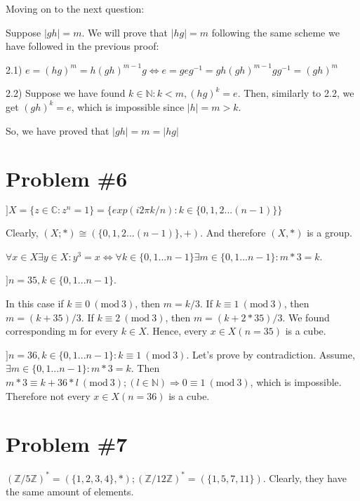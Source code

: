 \documentclass[a4paper,12pt]{article}
\newcommand{\Mod}[1]{\ (\mathrm{mod}\ #1)}
\newcommand{\gmznz}[1]{(\mathbb{Z}/#1\mathbb{Z})^*}
\begin{document}
Moving on to the next question:

Suppose $ |gh| = m $. We will prove that $ |hg| = m $ following the same scheme we have followed in the previous proof:

2.1) $ e = (hg)^{m} = h(gh)^{m-1}g \Leftrightarrow e = geg^{-1} = gh(gh)^{m-1}gg^{-1}= (gh)^m$

2.2)  Suppose we have found $ k\in \mathbb{N}: k < m , (hg)^{k} = e$. Then, similarly to 2.2, we get $ (gh)^k = e $, which is impossible since $ |h| = m > k $.

So, we have proved that $ |gh| = m = |hg|$
\hfill \square

\section*{Problem \#6}

\triangle

$\big] X = \{ z \in \mathbb{C} : z^n = 1 \} = \{ exp(i2\pi k / n): k \in \{0,1,2...(n-1)\} \}$

Clearly, $ (X; *) \cong (\{0,1,2...(n-1)\}, +) $. And therefore $ (X, *) $ is a group.

%		

$ \forall x \in X \exists y \in X : y^3 = x \Leftrightarrow \forall k \in \{0,1...n-1\} \exists m \in \{0,1...n-1\} : m*3 = k $.

$ \big] n = 35, k\in \{0,1...n-1\}$.

In this case if $ k\equiv 0 \Mod{3} $, then $ m = k/3 $. If $ k\equiv 1 \Mod{3} $, then $ m = (k+35)/3 $. If $ k\equiv2 \Mod{3} $, then $ m = (k+2*35)/3 $. We found corresponding m for every $ k\in X $. Hence, every $ x \in X (n=35) $ is a cube.

$ \big] n = 36, k\in \{0,1...n-1\}: k\equiv 1 \Mod{3}$. Let's prove by contradiction. Assume, $ \exists m\in \{0,1...n-1\}: m*3 = k$. Then $ m*3 \equiv k + 36*l \Mod{3}; (l\in\mathbb{N}) \Rightarrow 0 \equiv 1 \Mod{3}$, which is impossible. Therefore not every $ x \in X (n=36) $ is a cube.

\hfill \square

\section*{Problem \#7}

\triangle

$ \gmznz{5} = (\{1,2,3,4\}, *); \gmznz{12} = (\{1,5,7,11\})$. Clearly, they have the same amount of elements.
\end{document}
